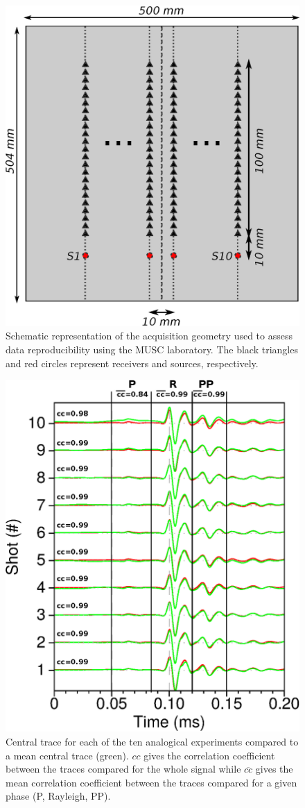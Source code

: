 \documentclass[extra,mreferee]{gji}
\begin{document}
\clearpage
\newpage

\begin{figure}
\centering
\includegraphics[width=0.50\columnwidth]{Fig/Fig08.eps}
\caption{Schematic representation of the acquisition geometry used to assess data reproducibility using the MUSC laboratory. The black triangles and red circles represent receivers and sources, respectively.}
\label{Fig:Fig08}
\end{figure}

\clearpage
\newpage

\begin{figure}
\centering
\includegraphics[width=0.50\columnwidth]{Fig/Fig09.eps}
\caption{Central trace for each of the ten analogical experiments compared to a mean central trace (green). $cc$ gives the correlation coefficient between the traces compared for the whole signal while $\overline{cc}$ gives the mean correlation coefficient between the traces compared for a given phase (P, Rayleigh, PP).}
\label{Fig:Fig09}
\end{figure}
\end{document}
